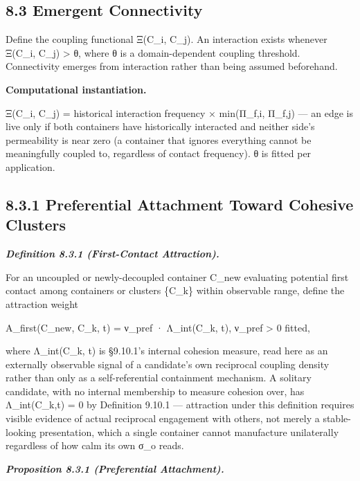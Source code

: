 \documentclass[
]{article}
\begin{document}
\hypertarget{emergent-connectivity}{%
\subsection{8.3 Emergent Connectivity}\label{emergent-connectivity}}

Define the coupling functional Ξ(C\_i, C\_j). An interaction exists
whenever Ξ(C\_i, C\_j) \textgreater{} θ, where θ is a domain-dependent
coupling threshold. Connectivity emerges from interaction rather than
being assumed beforehand.

\textbf{Computational instantiation.}

Ξ(C\_i, C\_j) = historical interaction frequency × min(Π\_f,i, Π\_f,j)
--- an edge is live only if both containers have historically interacted
and neither side's permeability is near zero (a container that ignores
everything cannot be meaningfully coupled to, regardless of contact
frequency). θ is fitted per application.

\hypertarget{preferential-attachment-toward-cohesive-clusters}{%
\subsection{8.3.1 Preferential Attachment Toward Cohesive
Clusters}\label{preferential-attachment-toward-cohesive-clusters}}

\emph{\textbf{Definition 8.3.1 (First-Contact Attraction).}}

For an uncoupled or newly-decoupled container C\_new evaluating
potential first contact among containers or clusters \{C\_k\} within
observable range, define the attraction weight

A\_first(C\_new, C\_k, t) = ν\_pref · Λ\_int(C\_k, t), ν\_pref
\textgreater{} 0 fitted,

where Λ\_int(C\_k, t) is §9.10.1's internal cohesion measure, read here
as an externally observable signal of a candidate's own reciprocal
coupling density rather than only as a self-referential containment
mechanism. A solitary candidate, with no internal membership to measure
cohesion over, has Λ\_int(C\_k,t) = 0 by Definition 9.10.1 ---
attraction under this definition requires visible evidence of actual
reciprocal engagement with others, not merely a stable-looking
presentation, which a single container cannot manufacture unilaterally
regardless of how calm its own σ\_o reads.

\emph{\textbf{Proposition 8.3.1 (Preferential Attachment).}}
\end{document}
